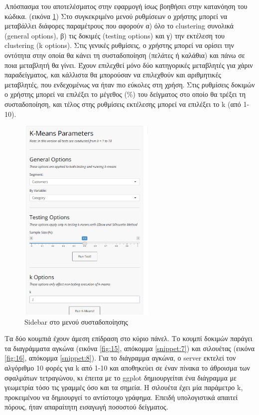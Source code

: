 \documentclass{article}
\begin{document}
Απόσπασμα του αποτελέσματος στην εφαρμογή ίσως βοηθήσει στην κατανόηση του κώδικα. (εικόνα \ref{fig:14}) Στο συγκεκριμένο μενού ρυθμίσεων ο χρήστης μπορεί να μεταβάλλει διάφορες παραμέτρους που αφορούν α) όλο το clustering συνολικά (general options), β) τις δοκιμές (testing options) και γ) την εκτέλεση του clustering (k options). Στις γενικές ρυθμίσεις, ο χρήστης μπορεί να ορίσει την οντότητα στην οποία θα κάνει τη συσταδοποίηση (πελάτες ή καλάθια) και πάνω σε ποια μεταβλητή θα γίνει. Έχουν επιλεχθεί μόνο δύο κατηγορικές μεταβλητές για χάριν παραδείγματος, και κάλλιστα θα μπορούσαν να επιλεχθούν και αριθμητικές μεταβλητές, που ενδεχομένως να ήταν πιο εύκολες στη χρήση. Στις ρυθμίσεις δοκιμών ο χρήστης μπορεί να επιλέξει το μέγεθος (\%) του δείγματος στο οποίο θα τρέξει τη συσταδοποίηση, και τέλος στης ρυθμίσεις εκτέλεσης μπορεί να επιλέξει το k (από 1-10). 

\begin{figure}[h]
    \centering
    \includegraphics[height=10cm]{pictures/14_sidebar.png}
    \caption{Sidebar στο μενού συσταδοποίησης}
    \label{fig:14}
\end{figure}

Τα δύο κουμπιά έχουν άμεση επίδραση στο κύριο πάνελ. Το κουμπί δοκιμών παράγει τα διαγράμματα αγκώνα (εικόνα \ref{fig:15}, απόκομμα \ref{snippet:7}) και σιλουέτας (εικόνα \ref{fig:16}, απόκομμα \ref{snippet:8}). Για το διάγραμμα αγκώνα, ο server εκτελεί τον αλγόριθμο 10 φορές για k από 1-10 και αποθηκεύει σε έναν πίνακα το άθροισμα των σφαλμάτων τετραγώνου, κι έπειτα με το ggplot δημιουργείται ένα διάγραμμα με γεωμετρία τόσο τις γραμμές όσο και τα σημεία. Η σιλουέτα έχει μία παράμετρο k, προκειμένου να δημιουργεί το αντίστοιχο γράφημα. Επειδή υπολογιστικά απαιτεί πόρους, ήταν απαραίτητη εισαγωγή ποσοστού δείγματος.
\end{document}
